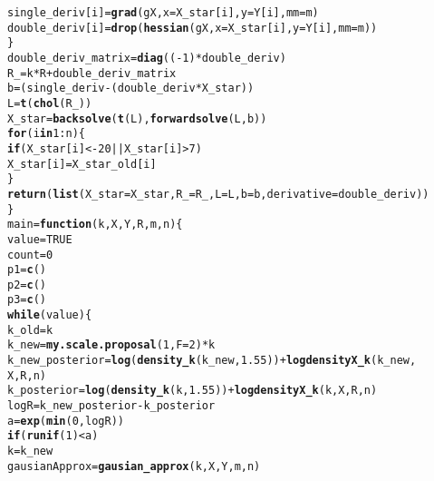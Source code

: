 \documentclass[12pt]{article}\usepackage[]{graphicx}\usepackage[]{color}
\makeatletter
\newcommand{\hlnum}[1]{\textcolor[rgb]{0.686,0.059,0.569}{#1}}%
\newcommand{\hlopt}[1]{\textcolor[rgb]{0,0,0}{#1}}%
\newcommand{\hlstd}[1]{\textcolor[rgb]{0.345,0.345,0.345}{#1}}%
\newcommand{\hlkwa}[1]{\textcolor[rgb]{0.161,0.373,0.58}{\textbf{#1}}}%
\newcommand{\hlkwb}[1]{\textcolor[rgb]{0.69,0.353,0.396}{#1}}%
\newcommand{\hlkwc}[1]{\textcolor[rgb]{0.333,0.667,0.333}{#1}}%
\newcommand{\hlkwd}[1]{\textcolor[rgb]{0.737,0.353,0.396}{\textbf{#1}}}%
\newenvironment{kframe}{%
 \def\at@end@of@kframe{}%
 \ifinner\ifhmode%
  \def\at@end@of@kframe{\end{minipage}}%
  \begin{minipage}{\columnwidth}%
 \fi\fi%
 \def\FrameCommand##1{\hskip\@totalleftmargin \hskip-\fboxsep
 \colorbox{shadecolor}{##1}\hskip-\fboxsep
     \hskip-\linewidth \hskip-\@totalleftmargin \hskip\columnwidth}%
 \MakeFramed {\advance\hsize-\width
   \@totalleftmargin\z@ \linewidth\hsize
   \@setminipage}}%
 {\par\unskip\endMakeFramed%
 \at@end@of@kframe}
\newenvironment{knitrout}{}{} %
\makeatother
\begin{document}
\begin{knitrout}
\begin{kframe}
\begin{alltt}
        \hlstd{single_deriv[i]} \hlkwb{=} \hlkwd{grad}\hlstd{(gX,} \hlkwc{x} \hlstd{= X_star[i],} \hlkwc{y} \hlstd{= Y[i],} \hlkwc{mm} \hlstd{= m)}
        \hlstd{double_deriv[i]} \hlkwb{=} \hlkwd{drop}\hlstd{(}\hlkwd{hessian}\hlstd{(gX,} \hlkwc{x} \hlstd{= X_star[i],} \hlkwc{y} \hlstd{= Y[i],} \hlkwc{mm} \hlstd{= m))}
    \hlstd{\}}
    \hlstd{double_deriv_matrix} \hlkwb{=} \hlkwd{diag}\hlstd{((}\hlopt{-}\hlnum{1}\hlstd{)} \hlopt{*} \hlstd{double_deriv)}
    \hlstd{R_} \hlkwb{=} \hlstd{k} \hlopt{*} \hlstd{R} \hlopt{+} \hlstd{double_deriv_matrix}
    \hlstd{b} \hlkwb{=} \hlstd{(single_deriv} \hlopt{-} \hlstd{(double_deriv} \hlopt{*} \hlstd{X_star))}
    \hlstd{L} \hlkwb{=} \hlkwd{t}\hlstd{(}\hlkwd{chol}\hlstd{(R_))}
    \hlstd{X_star} \hlkwb{=} \hlkwd{backsolve}\hlstd{(}\hlkwd{t}\hlstd{(L),} \hlkwd{forwardsolve}\hlstd{(L, b))}
    \hlkwa{for} \hlstd{(i} \hlkwa{in} \hlnum{1}\hlopt{:}\hlstd{n) \{}
        \hlkwa{if} \hlstd{(X_star[i]} \hlopt{< -}\hlnum{20} \hlopt{||} \hlstd{X_star[i]} \hlopt{>} \hlnum{7}\hlstd{)}
            \hlstd{X_star[i]} \hlkwb{=} \hlstd{X_star_old[i]}
    \hlstd{\}}
    \hlkwd{return}\hlstd{(}\hlkwd{list}\hlstd{(}\hlkwc{X_star} \hlstd{= X_star,} \hlkwc{R_} \hlstd{= R_,} \hlkwc{L} \hlstd{= L,} \hlkwc{b} \hlstd{= b,} \hlkwc{derivative} \hlstd{= double_deriv))}
\hlstd{\}}
\hlstd{main} \hlkwb{=} \hlkwa{function}\hlstd{(}\hlkwc{k}\hlstd{,} \hlkwc{X}\hlstd{,} \hlkwc{Y}\hlstd{,} \hlkwc{R}\hlstd{,} \hlkwc{m}\hlstd{,} \hlkwc{n}\hlstd{) \{}
    \hlstd{value} \hlkwb{=} \hlnum{TRUE}
    \hlstd{count} \hlkwb{=} \hlnum{0}
    \hlstd{p1} \hlkwb{=} \hlkwd{c}\hlstd{()}
    \hlstd{p2} \hlkwb{=} \hlkwd{c}\hlstd{()}
    \hlstd{p3} \hlkwb{=} \hlkwd{c}\hlstd{()}
    \hlkwa{while} \hlstd{(value) \{}
        \hlstd{k_old} \hlkwb{=} \hlstd{k}
        \hlstd{k_new} \hlkwb{=} \hlkwd{my.scale.proposal}\hlstd{(}\hlnum{1}\hlstd{,} \hlkwc{F} \hlstd{=} \hlnum{2}\hlstd{)} \hlopt{*} \hlstd{k}
        \hlstd{k_new_posterior} \hlkwb{=} \hlkwd{log}\hlstd{(}\hlkwd{density_k}\hlstd{(k_new,} \hlnum{1.55}\hlstd{))} \hlopt{+} \hlkwd{logdensityX_k}\hlstd{(k_new,}
            \hlstd{X, R, n)}
        \hlstd{k_posterior} \hlkwb{=} \hlkwd{log}\hlstd{(}\hlkwd{density_k}\hlstd{(k,} \hlnum{1.55}\hlstd{))} \hlopt{+} \hlkwd{logdensityX_k}\hlstd{(k, X, R, n)}
        \hlstd{logR} \hlkwb{=} \hlstd{k_new_posterior} \hlopt{-} \hlstd{k_posterior}
        \hlstd{a} \hlkwb{=} \hlkwd{exp}\hlstd{(}\hlkwd{min}\hlstd{(}\hlnum{0}\hlstd{, logR))}
        \hlkwa{if} \hlstd{(}\hlkwd{runif}\hlstd{(}\hlnum{1}\hlstd{)} \hlopt{<} \hlstd{a)}
            \hlstd{k} \hlkwb{=} \hlstd{k_new}
        \hlstd{gausianApprox} \hlkwb{=} \hlkwd{gausian_approx}\hlstd{(k, X, Y, m, n)}

\end{alltt}
\end{kframe}
\end{knitrout}
\end{document}
